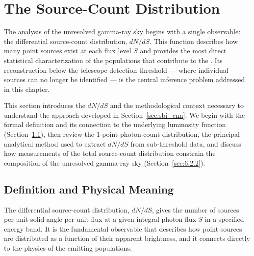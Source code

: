 \section{The Source-Count Distribution}
\label{sec:source_count}

The analysis of the unresolved gamma-ray sky begins with a single observable: the differential source-count distribution, $dN/dS$.
This function describes how many point sources exist at each flux level $S$ and provides the most direct statistical characterization of the populations that contribute to the \UGRB.
Its reconstruction below the telescope detection threshold --- where individual sources can no longer be identified --- is the central inference problem addressed in this chapter.

This section introduces the $dN/dS$ and the methodological context necessary to understand the approach developed in Section~\ref{sec:sbi_cnn}. We begin with the formal definition and its connection to the underlying luminosity function (Section~\ref{sec:6.2.1}), then review the 1-point photon-count distribution, the principal analytical method used to extract $dN/dS$ from sub-threshold data, and discuss how measurements of the total source-count distribution constrain the composition of the unresolved gamma-ray sky (Section~\ref{sec:6.2.2}).

\subsection{Definition and Physical Meaning}
\label{sec:6.2.1}

The differential source-count distribution, $dN/dS$, gives the number of sources per unit solid angle per unit flux at a given integral photon flux $S$ in a specified energy band.
It is the fundamental observable that describes how point sources are distributed as a function of their apparent brightness, and it connects directly to the physics of the emitting populations.


